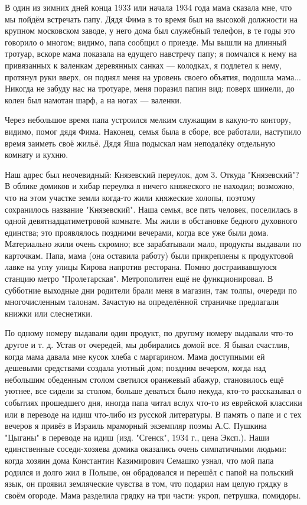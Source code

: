 \label{153-1}
В один из зимних дней конца 1933 или начала 1934 года мама сказала мне, что мы пойдём встречать папу. Дядя Фима в то время был на высокой должности на крупном московском заводе, у него дома был служебный телефон, в те годы это говорило о многом; видимо, папа сообщил о приезде. Мы вышли на длинный тротуар, вскоре мама показала на едущего навстречу папу; я помчался к нему на привязанных к валенкам деревянных санках — колодках, я подлетел к нему, протянул руки вверх, он поднял меня на уровень своего объятия, подошла мама... Никогда не забуду нас на тротуаре, меня поразил папин вид: поверх шинели, до колен был намотан шарф, а на ногах — валенки.

Через небольшое время папа устроился мелким служащим в какую-то контору, видимо, помог дядя Фима. Наконец, семья была в сборе, все работали, наступило время заиметь своё жильё. Дядя Яша подыскал нам неподалёку отдельную комнату и кухню.

\label{154-1}
Наш адрес был неочевидный: Князевский переулок, дом 3. Откуда "Князевский"? В облике домиков и хибар переулка я ничего княжеского не находил; возможно, что на этом участке земли когда-то жили княжеские холопы, поэтому сохранилось название "Князевский". Наша семья, все пять человек, поселилась в одной девятнадцатиметровой комнате. Мы жили в обстановке бедного духовного единства; это проявлялось поздними вечерами, когда все уже были дома. Материально жили очень скромно; все зарабатывали мало, продукты выдавали по карточкам. Папа, мама (она оставила работу) были прикреплены к продуктовой лавке на углу улицы Кирова напротив ресторана. Помню достраивавшуюся станцию метро "Пролетарская". Метрополитен ещё не функционировал. В субботние выходные дни родители брали меня в магазин, там толпы, очереди по многочисленным талонам. Зачастую на определённой страничке предлагали книжки или слеснетики.

\label{155-1}
По одному номеру выдавали один продукт, по другому номеру выдавали что-то другое и т. д. Устав от очередей, мы добирались домой все. Я бывал счастлив, когда мама давала мне кусок хлеба с маргарином. Мама доступными ей дешевыми средствами создала уютный дом; поздним вечером, когда над небольшим обеденным столом светился оранжевый абажур, становилось ещё уютнее, все сидели за столом, больше деваться было некуда, кто-то рассказывал о событиях прошедшего дня, иногда папа читал вслух что-то из еврейской классики или в переводе на идиш что-либо из русской литературы. В память о папе и с тех вечеров я привёз в Израиль мраморный экземпляр поэмы А.С. Пушкина "Цыганы" в переводе на идиш (изд. "Сгенск", 1934 г., цена Эксп.). Наши единственные соседи-хозяева домика оказались очень симпатичными людьми: когда хозяин дома Константин Казимирович Семашко узнал, что мой папа родился и долго жил в Польше, он обрадовался и перешёл с папой на польский язык, он проявил земляческие чувства в том, что подарил нам целую грядку в своём огороде. Мама разделила грядку на три части: укроп, петрушка, помидоры.

